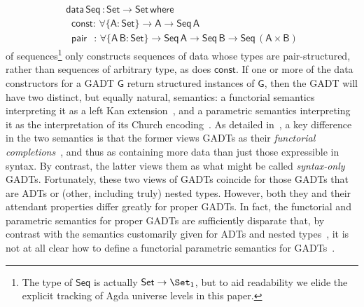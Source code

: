 \documentclass[sigplan,10pt]{acmart}
\begin{document}
\begin{equation}\label{eq:seq}
\begin{array}{l}
\mathsf{data\, Seq\,: Set \to Set\,where}\\
\mathsf{\;\;const :\, \forall \{A : Set\} \to A \to Seq\,A}\\
\mathsf{\;\;pair\;\;\, :\,\forall \{A\,B : Set\} \to Seq \,A \to Seq\,B \to
  Seq\,(A \times B)}
\end{array}
\end{equation}
\noindent
of sequences\footnote{The type of $\mathsf{Seq}$ is actually
  $\mathsf{Set \to \Set_1}$, but to aid readability we elide the
  explicit tracking of Agda universe levels in this paper.} only
constructs sequences of data whose types are pair-structured, rather
than sequences of arbitrary type, as does $\mathsf{const}$. If one or
more of the data constructors for a GADT $\mathsf{G}$ return
structured instances of $\mathsf{G}$, then the GADT will have two
distinct, but equally natural, semantics: a functorial semantics
interpreting it as a left Kan extension~\cite{mac71}, and a parametric
semantics interpreting it as the interpretation of its Church
encoding~\cite{atk12,vw10}. As detailed in~\cite{jg21}, a key
difference in the two semantics is that the former views GADTs as
their {\em functorial completions}~\cite{jp19}, and thus as containing
more data than just those expressible in syntax. By contrast, the
latter views them as what might be called {\em syntax-only}\/
GADTs. Fortunately, these two views of GADTs coincide for those GADTs
that are ADTs or (other, including truly) nested types.  However, both
they and their attendant properties differ greatly for proper
GADTs. In fact, the functorial and parametric semantics for proper
GADTs are sufficiently disparate that, by contrast with the semantics
customarily given for ADTs and nested
types~\cite{bfss90,gjfor15,jgj21f}, it is not at all clear how to
define a functorial parametric semantics for GADTs~\cite{jg21}.
\end{document}
